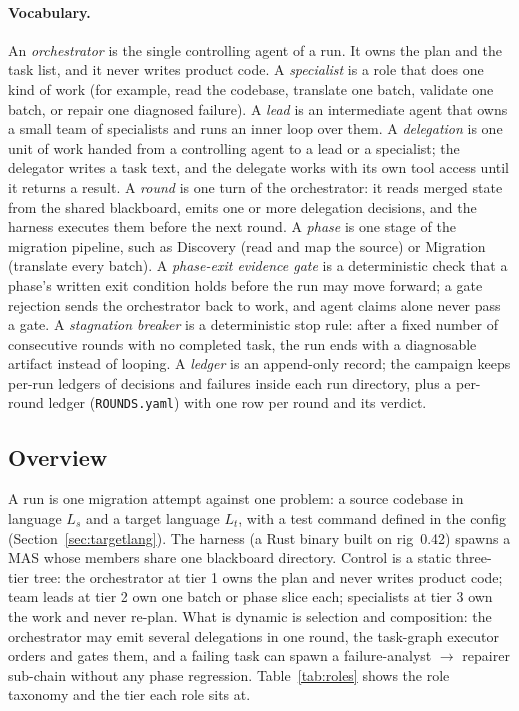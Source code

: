 \documentclass[11pt]{article}
\begin{document}
\paragraph{Vocabulary.}
An \emph{orchestrator} is the single controlling agent of a run. It owns
the plan and the task list, and it never writes product code. A
\emph{specialist} is a role that does one kind of work (for example,
read the codebase, translate one batch, validate one batch, or repair
one diagnosed failure). A \emph{lead} is an intermediate agent that owns
a small team of specialists and runs an inner loop over them. A
\emph{delegation} is one unit of work handed from a controlling agent to
a lead or a specialist; the delegator writes a task text, and the
delegate works with its own tool access until it returns a result. A
\emph{round} is one turn of the orchestrator: it reads merged state from
the shared blackboard, emits one or more delegation decisions, and the
harness executes them before the next round. A \emph{phase} is one stage
of the migration pipeline, such as Discovery (read and map the source)
or Migration (translate every batch). A \emph{phase-exit evidence gate}
is a deterministic check that a phase's written exit condition holds
before the run may move forward; a gate rejection sends the orchestrator
back to work, and agent claims alone never pass a gate. A
\emph{stagnation breaker} is a deterministic stop rule: after a fixed
number of consecutive rounds with no completed task, the run ends with a
diagnosable artifact instead of looping. A \emph{ledger} is an
append-only record; the campaign keeps per-run ledgers of decisions and
failures inside each run directory, plus a per-round ledger
(\texttt{ROUNDS.yaml}) with one row per round and its verdict.

\subsection{Overview}

A run is one migration attempt against one problem: a source codebase
in language $L_s$ and a target language $L_t$, with a test command
defined
in the config (Section~\ref{sec:targetlang}). The harness (a Rust binary built on rig~0.42) spawns a MAS
whose members share one blackboard directory. Control is a static
three-tier tree: the orchestrator at tier 1 owns the plan and never
writes product code; team leads at tier 2 own one batch or phase slice
each; specialists at tier 3 own the work and never re-plan. What is
dynamic is selection and composition: the orchestrator may emit several
delegations in one round, the task-graph executor orders and gates them,
and a failing task can spawn a failure-analyst $\rightarrow$ repairer
sub-chain without any phase regression. Table~\ref{tab:roles} shows the
role taxonomy and the tier each role sits at.
\end{document}
